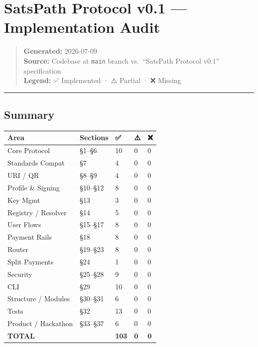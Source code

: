 \documentclass[
]{article}
\author{}
\date{}
\begin{document}
\hypertarget{satspath-protocol-v0.1-implementation-audit}{%
\section{SatsPath Protocol v0.1 --- Implementation
Audit}\label{satspath-protocol-v0.1-implementation-audit}}

\begin{quote}
\textbf{Generated:} 2026-07-09\\
\textbf{Source:} Codebase at \texttt{main} branch vs.~``SatsPath
Protocol v0.1'' specification\\
\textbf{Legend:} ✅ Implemented · ⚠️ Partial · ❌ Missing
\end{quote}

\begin{center}\rule{0.5\linewidth}{0.5pt}\end{center}

\hypertarget{summary}{%
\subsection{Summary}\label{summary}}

\begin{longtable}[]{@{}lllll@{}}
\toprule\noalign{}
Area & Sections & ✅ & ⚠️ & ❌ \\
\midrule\noalign{}
\endhead
\bottomrule\noalign{}
\endlastfoot
Core Protocol & §1--§6 & 10 & 0 & 0 \\
Standards Compat & §7 & 4 & 0 & 0 \\
URI / QR & §8--§9 & 4 & 0 & 0 \\
Profile \& Signing & §10--§12 & 8 & 0 & 0 \\
Key Mgmt & §13 & 3 & 0 & 0 \\
Registry / Resolver & §14 & 5 & 0 & 0 \\
User Flows & §15--§17 & 8 & 0 & 0 \\
Payment Rails & §18 & 8 & 0 & 0 \\
Router & §19--§23 & 8 & 0 & 0 \\
Split Payments & §24 & 1 & 0 & 0 \\
Security & §25--§28 & 9 & 0 & 0 \\
CLI & §29 & 10 & 0 & 0 \\
Structure / Modules & §30--§31 & 6 & 0 & 0 \\
Tests & §32 & 13 & 0 & 0 \\
Product / Hackathon & §33--§37 & 6 & 0 & 0 \\
\textbf{TOTAL} & & \textbf{103} & \textbf{0} & \textbf{0} \\
\end{longtable}
\end{document}
